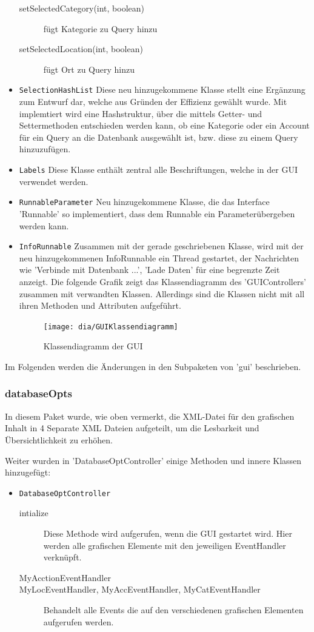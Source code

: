 \begin{itemize}
\begin{description}
		\item[setSelectedCategory(int, boolean)] fügt Kategorie zu Query hinzu
		\item[setSelectedLocation(int, boolean)] fügt Ort zu Query hinzu
	\end{description}
	\item \lstinline{SelectionHashList}
	\quad
	Diese neu hinzugekommene Klasse stellt  eine Ergänzung zum Entwurf dar, welche aus Gründen der Effizienz gewählt wurde. Mit implemtiert wird eine Hashstruktur, über die mittels Getter- und Settermethoden entschieden werden kann, ob eine Kategorie oder ein Account für ein Query an die Datenbank ausgewählt ist, bzw. diese zu einem Query hinzuzufügen.
	\item \lstinline{Labels}
	\quad
	Diese Klasse enthält zentral alle Beschriftungen, welche in der GUI verwendet werden.
	\item \lstinline{RunnableParameter}
	\quad 
	Neu hinzugekommene Klasse, die das Interface 'Runnable' so implementiert, dass dem Runnable ein Parameterübergeben werden kann.
	\item \lstinline{InfoRunnable}
	\quad
	Zusammen mit der gerade geschriebenen Klasse, wird mit der neu hinzugekommenen InfoRunnable ein Thread gestartet, der Nachrichten wie 'Verbinde mit Datenbank ...', 'Lade Daten' für eine begrenzte Zeit anzeigt.	
	Die folgende Grafik zeigt das Klassendiagramm des 'GUIControllers' zusammen mit verwandten Klassen. Allerdings sind die Klassen nicht mit all ihren Methoden und Attributen aufgeführt.
	\begin{figure}[H]
		\centering
		\texttt{[image: dia/GUIKlassendiagramm]}
		\caption{Klassendiagramm der GUI}
		\label{fig:GUI}
	\end{figure}
\end{itemize}

Im Folgenden werden die Änderungen in den Subpaketen von 'gui' beschrieben.

\subsubsection{databaseOpts}
In diesem Paket wurde, wie oben vermerkt, die XML-Datei für den grafischen Inhalt in 4 Separate XML Dateien aufgeteilt, um die Lesbarkeit und Übersichtlichkeit zu erhöhen.


Weiter wurden in 'DatabaseOptController' einige Methoden und innere Klassen hinzugefügt:
\begin{itemize}
	\item \lstinline{DatabaseOptController}
	\quad
	\begin{description}
		\item[intialize]
		\quad
		Diese Methode wird aufgerufen, wenn die GUI gestartet wird. Hier werden alle grafischen Elemente mit den jeweiligen EventHandler verknüpft.
		\item[MyAcctionEventHandler]
		\item[MyLocEventHandler, MyAccEventHandler, MyCatEventHandler] 
		\quad
		Behandelt alle Events die auf den verschiedenen grafischen Elementen aufgerufen werden.
	\end{description}
\end{itemize}
	
